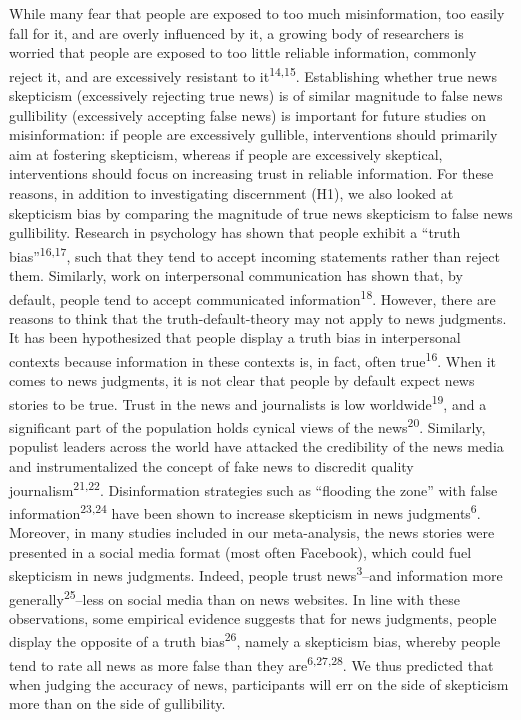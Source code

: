 \documentclass[
  man]{apa6}
\begin{document}
While many fear that people are exposed to too much misinformation, too easily fall for it, and are overly influenced by it, a growing body of researchers is worried that people are exposed to too little reliable information, commonly reject it, and are excessively resistant to it\textsuperscript{14,15}. Establishing whether true news skepticism (excessively rejecting true news) is of similar magnitude to false news gullibility (excessively accepting false news) is important for future studies on misinformation: if people are excessively gullible, interventions should primarily aim at fostering skepticism, whereas if people are excessively skeptical, interventions should focus on increasing trust in reliable information. For these reasons, in addition to investigating discernment (H1), we also looked at skepticism bias by comparing the magnitude of true news skepticism to false news gullibility. Research in psychology has shown that people exhibit a ``truth bias''\textsuperscript{16,17}, such that they tend to accept incoming statements rather than reject them. Similarly, work on interpersonal communication has shown that, by default, people tend to accept communicated information\textsuperscript{18}. However, there are reasons to think that the truth-default-theory may not apply to news judgments. It has been hypothesized that people display a truth bias in interpersonal contexts because information in these contexts is, in fact, often true\textsuperscript{16}. When it comes to news judgments, it is not clear that people by default expect news stories to be true. Trust in the news and journalists is low worldwide\textsuperscript{19}, and a significant part of the population holds cynical views of the news\textsuperscript{20}. Similarly, populist leaders across the world have attacked the credibility of the news media and instrumentalized the concept of fake news to discredit quality journalism\textsuperscript{21,22}. Disinformation strategies such as ``flooding the zone'' with false information\textsuperscript{23,24} have been shown to increase skepticism in news judgments\textsuperscript{6}. Moreover, in many studies included in our meta-analysis, the news stories were presented in a social media format (most often Facebook), which could fuel skepticism in news judgments. Indeed, people trust news\textsuperscript{3}--and information more generally\textsuperscript{25}--less on social media than on news websites. In line with these observations, some empirical evidence suggests that for news judgments, people display the opposite of a truth bias\textsuperscript{26}, namely a skepticism bias, whereby people tend to rate all news as more false than they are\textsuperscript{6,27,28}. We thus predicted that when judging the accuracy of news, participants will err on the side of skepticism more than on the side of gullibility.
\end{document}
